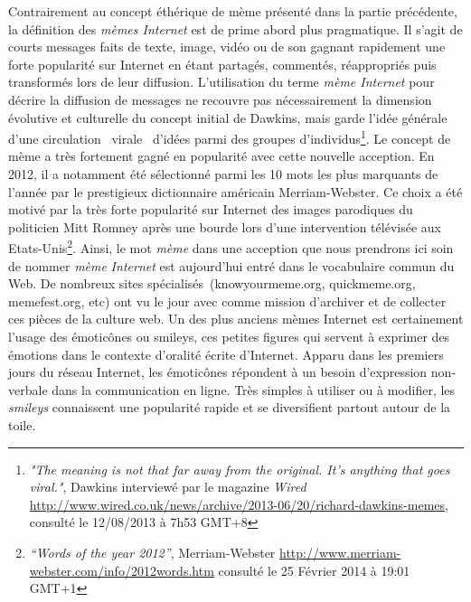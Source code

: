 Contrairement au concept éthérique de mème présenté dans la partie précédente, la définition des \textit{mèmes Internet }est de prime abord plus pragmatique. Il s{\textquoteright}agit de courts messages faits de texte, image, vidéo ou de son gagnant rapidement une forte popularité sur Internet en étant partagés, commentés, réappropriés puis transformés lors de leur diffusion. L{\textquoteright}utilisation du terme \textit{mème Internet }pour décrire la diffusion de messages ne recouvre pas nécessairement la dimension évolutive et culturelle du concept initial de Dawkins, mais garde l{\textquoteright}idée générale d{\textquoteright}une circulation {\guillemotleft}~virale~{\guillemotright} d{\textquoteright}idées parmi des groupes d{\textquoteright}individus\footnote{ \textit{"The meaning is not that far away from the original. It's anything that goes viral."}, Dawkins interviewé par le magazine \textit{Wired} \url{http://www.wired.co.uk/news/archive/2013-06/20/richard-dawkins-memes}, consulté le 12/08/2013 à 7h53 GMT+8}. Le concept de mème a très fortement gagné en popularité avec cette nouvelle acception. En 2012, il a notamment été sélectionné parmi les 10 mots les plus marquants de l{\textquoteright}année par le prestigieux dictionnaire américain Merriam-Webster. Ce choix a été motivé par la très forte popularité sur Internet des images parodiques du politicien Mitt Romney après une bourde lors d{\textquoteright}une intervention télévisée aux Etats-Unis\footnote{ \textit{{\textquotedblleft}Words of the year 2012{\textquotedblright}}, Merriam-Webster \url{http://www.merriam-webster.com/info/2012words.htm} consulté le 25 Février 2014 à 19:01 GMT+1}. Ainsi, le mot \textit{mème }dans une acception que nous prendrons ici soin de nommer \textit{mème} \textit{Internet} est aujourd{\textquoteright}hui entré dans le vocabulaire commun du Web. De nombreux sites spécialisés~(knowyourmeme.org, quickmeme.org, memefest.org, etc) ont vu le jour avec comme mission d{\textquoteright}archiver et de collecter ces pièces de la culture web. Un des plus anciens mèmes Internet est certainement l{\textquoteright}usage des émoticônes ou smileys, ces petites figures qui servent à exprimer des émotions dans le contexte d{\textquoteright}oralité écrite d{\textquoteright}Internet. Apparu dans les premiers jours du réseau Internet, les émoticônes répondent à un besoin d{\textquoteright}expression non-verbale dans la communication en ligne. Très simples à utiliser ou à modifier, les \textit{smileys }connaissent une popularité rapide et se diversifient partout autour de la toile.  


